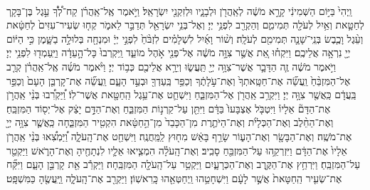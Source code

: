 \documentclass[twoside, openany, parskip=half, 11pt]{book}
\begin{document}
\begin{footnotesize}
\begin{multicols}{2}
\\
 וַֽיְהִי֙ בַּיּ֣וֹם הַשְּׁמִינִ֔י קָרָ֣א מֹשֶׁ֔ה לְאַֽהֲרֹ֖ן וּלְבָנָ֑יו וּלְזִקְנֵ֖י יִשְׂרָאֵֽל׃ וַיֹּ֣אמֶר אֶֽל־אַֽהֲרֹ֗ן קַח־לְ֠ךָ֠ עֵ֣גֶל בֶּן־בָּקָ֧ר לְחַטָּ֛את וְאַ֥יִל לְעֹלָ֖ה תְּמִימִ֑ם וְהַקְרֵ֖ב לִפְנֵ֥י יְיָ׃ וְאֶל־בְּנֵ֥י יִשְׂרָאֵ֖ל תְּדַבֵּ֣ר לֵאמֹ֑ר קְח֤וּ שְׂעִיר־עִזִּים֙ לְחַטָּ֔את וְעֵ֨גֶל וָכֶ֧בֶשׂ בְּנֵֽי־שָׁנָ֛ה תְּמִימִ֖ם לְעֹלָֽה׃ וְשׁ֨וֹר וָאַ֜יִל לִשְׁלָמִ֗ים לִזְבֹּ֨חַ֙ לִפְנֵ֣י יְיָ֔ וּמִנְחָ֖ה בְּלוּלָ֣ה בַשָּׁ֑מֶן כִּ֣י הַיּ֔וֹם יְיָ֖ נִרְאָ֥ה אֲלֵיכֶֽם׃ וַיִּקְח֗וּ אֵ֚ת אֲשֶׁ֣ר צִוָּ֣ה מֹשֶׁ֔ה אֶל־פְּנֵ֖י אֹ֣הֶל מוֹעֵ֑ד וַֽיִּקְרְבוּ֙ כָּל־הָ֣עֵדָ֔ה וַיַּֽעַמְד֖וּ לִפְנֵ֥י יְיָ׃ וַיֹּ֣אמֶר מֹשֶׁ֔ה זֶ֧ה הַדָּבָ֛ר אֲשֶׁר־צִוָּ֥ה יְיָ֖ תַּֽעֲשׂ֑וּ וְיֵרָ֥א אֲלֵיכֶ֖ם כְּב֥וֹד יְיָ׃  וַיֹּ֨אמֶר מֹשֶׁ֜ה אֶֽל־אַֽהֲרֹ֗ן קְרַ֤ב אֶל־הַמִּזְבֵּ֨חַ֙ וַֽעֲשֵׂ֞ה אֶת־חַטָּֽאתְךָ֙ וְאֶת־עֹ֣לָתֶ֔ךָ וְכַפֵּ֥ר בַּֽעַדְךָ֖ וּבְעַ֣ד הָעָ֑ם וַֽעֲשֵׂ֞ה אֶת־קָרְבַּ֤ן הָעָם֙ וְכַפֵּ֣ר בַּֽעֲדָ֔ם כַּֽאֲשֶׁ֖ר צִוָּ֥ה יְיָ׃ וַיִּקְרַ֥ב אַֽהֲרֹ֖ן אֶל־הַמִּזְבֵּ֑חַ וַיִּשְׁחַ֛ט אֶת־עֵ֥גֶל הַֽחַטָּ֖את אֲשֶׁר־לֽוֹ׃ וַ֠יַּקְרִ֠בוּ בְּנֵ֨י אַֽהֲרֹ֣ן אֶת־הַדָּם֘ אֵלָיו֒ וַיִּטְבֹּ֤ל אֶצְבָּעוֹ֙ בַּדָּ֔ם וַיִּתֵּ֖ן עַל־קַרְנ֣וֹת הַמִּזְבֵּ֑חַ וְאֶת־הַדָּ֣ם יָצַ֔ק אֶל־יְס֖וֹד הַמִּזְבֵּֽחַ׃ וְאֶת־הַחֵ֨לֶב וְאֶת־הַכְּלָיֹ֜ת וְאֶת־הַיֹּתֶ֤רֶת מִן־הַכָּבֵד֙ מִן־הַ֣חַטָּ֔את הִקְטִ֖יר הַמִּזְבֵּ֑חָה כַּֽאֲשֶׁ֛ר צִוָּ֥ה יְיָ֖ אֶת־מֹשֶֽׁה׃  וְאֶת־הַבָּשָׂ֖ר וְאֶת־הָע֑וֹר שָׂרַ֣ף בָּאֵ֔שׁ מִח֖וּץ לַֽמַּֽחֲנֶֽה׃ וַיִּשְׁחַ֖ט אֶת־הָֽעֹלָ֑ה וַ֠יַּמְצִ֠אוּ בְּנֵ֨י אַֽהֲרֹ֤ן אֵלָיו֙ אֶת־הַדָּ֔ם וַיִּזְרְקֵ֥הוּ עַל־הַמִּזְבֵּ֖חַ סָבִֽיב׃ וְאֶת־הָֽעֹלָ֗ה הִמְצִ֧יאוּ אֵלָ֛יו לִנְתָחֶ֖יהָ וְאֶת־הָרֹ֑אשׁ וַיַּקְטֵ֖ר עַל־הַמִּזְבֵּֽחַ׃ וַיִּרְחַ֥ץ אֶת־הַקֶּ֖רֶב וְאֶת־הַכְּרָעָ֑יִם וַיַּקְטֵ֥ר עַל־הָֽעֹלָ֖ה הַמִּזְבֵּֽחָה׃ וַיַּקְרֵ֕ב אֵ֖ת קָרְבַּ֣ן הָעָ֑ם וַיִּקַּ֞ח אֶת־שְׂעִ֤יר הַֽחַטָּאת֙ אֲשֶׁ֣ר לָעָ֔ם וַיִּשְׁחָטֵ֥הוּ וַֽיְחַטְּאֵ֖הוּ כָּֽרִאשֽׁוֹן׃ וַיַּקְרֵ֖ב אֶת־הָֽעֹלָ֑ה וַֽיַּֽעֲשֶׂ֖הָ כַּמִּשְׁפָּֽט׃


\end{multicols}
\end{footnotesize}
\end{document}
